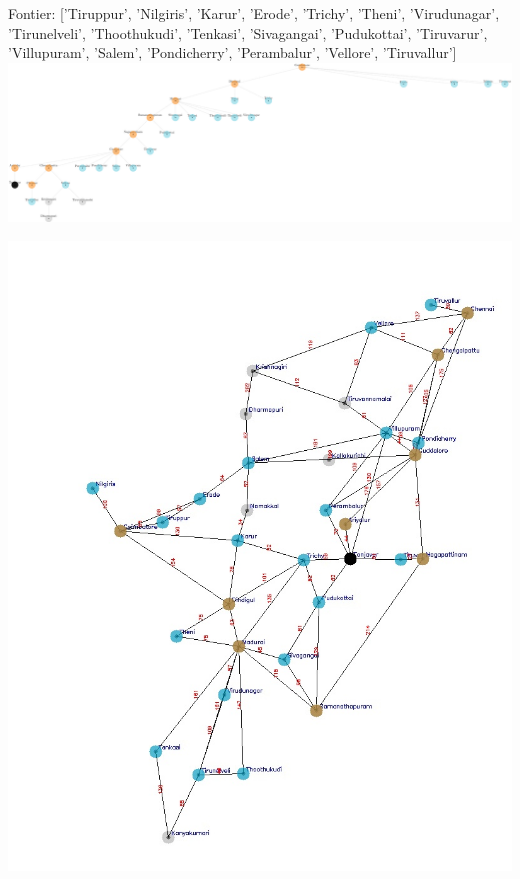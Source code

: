 \documentclass[xcolor=table]{beamer}
\begin{document}
\begin{frame}
  { \tiny Fontier: ['Tiruppur', 'Nilgiris', 'Karur', 'Erode', 'Trichy', 'Theni', 'Virudunagar', 'Tirunelveli', 'Thoothukudi', 'Tenkasi', 'Sivagangai', 'Pudukottai', 'Tiruvarur', 'Villupuram', 'Salem', 'Pondicherry', 'Perambalur', 'Vellore', 'Tiruvallur'] }
  \includegraphics[width=1\textwidth]{../DFSNodes/13-1.png}
  \begin{center}
    \includegraphics[height=0.45\textheight]{../DFSoutput/tamilDFS11.jpg}
  \end{center}
\end{frame}
\end{document}
